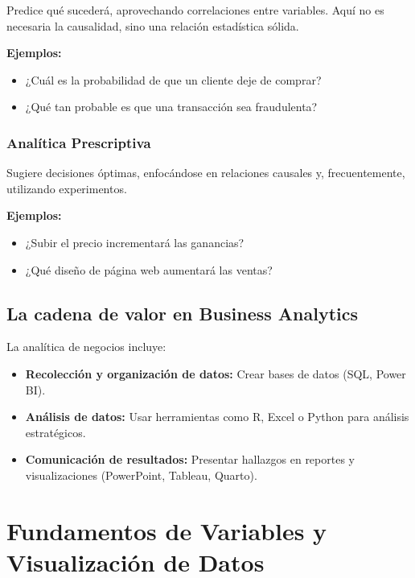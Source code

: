 \documentclass[
  spanish,
  letterpaper,
  DIV=11,
  numbers=noendperiod]{scrreprt}
\providecommand{\tightlist}{%
  \setlength{\itemsep}{0pt}\setlength{\parskip}{0pt}}
\begin{document}
Predice qué sucederá, aprovechando correlaciones entre variables. Aquí
no es necesaria la causalidad, sino una relación estadística sólida.

\textbf{Ejemplos:}

\begin{itemize}
\tightlist
\item
  ¿Cuál es la probabilidad de que un cliente deje de comprar?
\item
  ¿Qué tan probable es que una transacción sea fraudulenta?
\end{itemize}

\subsection{Analítica Prescriptiva}\label{analuxedtica-prescriptiva}

Sugiere decisiones óptimas, enfocándose en relaciones causales y,
frecuentemente, utilizando experimentos.

\textbf{Ejemplos:}

\begin{itemize}
\tightlist
\item
  ¿Subir el precio incrementará las ganancias?
\item
  ¿Qué diseño de página web aumentará las ventas?
\end{itemize}

\section{La cadena de valor en Business
Analytics}\label{la-cadena-de-valor-en-business-analytics}

La analítica de negocios incluye:

\begin{itemize}
\tightlist
\item
  \textbf{Recolección y organización de datos:} Crear bases de datos
  (SQL, Power BI).
\item
  \textbf{Análisis de datos:} Usar herramientas como R, Excel o Python
  para análisis estratégicos.
\item
  \textbf{Comunicación de resultados:} Presentar hallazgos en reportes y
  visualizaciones (PowerPoint, Tableau, Quarto).
\end{itemize}


\chapter{Fundamentos de Variables y Visualización de
Datos}\label{fundamentos-de-variables-y-visualizaciuxf3n-de-datos}
\end{document}
